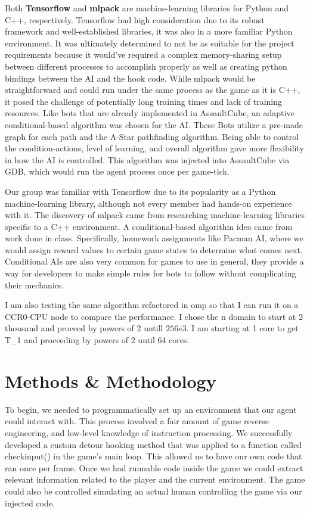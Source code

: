 \documentclass[11pt,a4paper]{article}
\begin{document}
Both \textbf{Tensorflow} and \textbf{mlpack} are machine-learning libraries for Python and C++, respectively. Tensorflow had high consideration due to its robust framework and well-established libraries, it was also in a more familiar Python environment. It was ultimately determined to not be as suitable for the project requirements because it would’ve required a complex memory-sharing setup between different processes to accomplish properly as well as creating python bindings between the AI and the hook code. While mlpack would be straightforward and could run under the same process as the game as it is C++, it posed the challenge of potentially long training times and lack of training resources. Like bots that are already implemented in AssaultCube, an adaptive conditional-based algorithm was chosen for the AI. These Bots utilize a pre-made graph for each path and the A-Star pathfinding algorithm. Being able to control the condition-actions, level of learning, and overall algorithm gave more flexibility in how the AI is controlled. This algorithm was injected into AssaultCube via GDB, which would run the agent process once per game-tick.

Our group was familiar with Tensorflow due to its popularity as a Python machine-learning library, although not every member had hands-on experience with it. The discovery of mlpack came from researching machine-learning libraries specific to a C++ environment. A conditional-based algorithm idea came from work done in class. Specifically, homework assignments like Pacman AI, where we would assign reward values to certain game states to determine what comes next. Conditional AIs are also very common for games to use in general, they provide a way for developers to make simple rules for bots to follow without complicating their mechanics.

I am also testing the same algorithm refactored in omp so that I can run it on a CCR0-CPU node to compare the performance. I chose the n domain to start at 2 thousand and proceed by powers of 2 untill $256e3$. I am starting at 1 core to get T\_1 and proceeding by powers of 2 until 64 cores.

\section{Methods \& Methodology}
To begin, we needed to programmatically set up an environment that our agent could interact with. This process involved a fair amount of game reverse engineering, and low-level knowledge of instruction processing. We successfully developed a custom detour hooking method that was applied to a function called checkinput() in the game’s main loop. This allowed us to have our own code that ran once per frame. Once we had runnable code inside the game we could extract relevant information related to the player and the current environment. The game could also be controlled simulating an actual human controlling the game via our injected code. 
\end{document}
